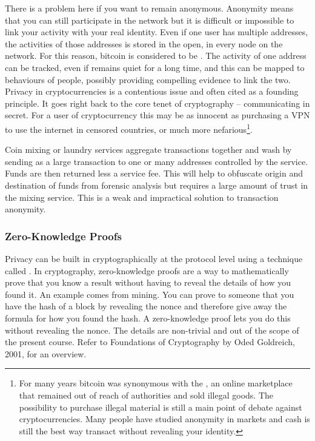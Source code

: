 There is a problem here if you want to remain anonymous. Anonymity means that you can still participate in the network but it is difficult or impossible to link your activity with your real identity. Even if one user has multiple addresses, the activities of those addresses is stored in the open, in every node on the network. For this reason, bitcoin is considered to be . The activity of one address can be tracked, even if remains quiet for a long time, and this can be mapped to behaviours of people, possibly providing compelling evidence to link the two. Privacy in cryptocurrencies is a contentious issue and often cited as a founding principle. It goes right back to the core tenet of cryptography -- communicating in secret. For a user of cryptocurrency this may be as innocent as purchasing a VPN to use the internet in censored countries, or much more nefarious\footnote{For many years bitcoin was synonymous with the , an online marketplace that remained out of reach of authorities and sold illegal goods. The possibility to purchase illegal material is still a main point of debate against cryptocurrencies. Many people have studied anonymity in markets and cash is still the best way transact without revealing your identity.}.

Coin mixing or laundry services aggregate transactions together and wash by sending as a large transaction to one or many addresses controlled by the service. Funds are then returned less a service fee. This will help to obfuscate origin and destination of funds from forensic analysis but requires a large amount of trust in the mixing service. This is a weak and impractical solution to transaction anonymity. 

\subsubsection*{Zero-Knowledge Proofs}
Privacy can be built in cryptographically at the protocol level using a technique called . In cryptography, zero-knowledge proofs are a way to mathematically prove that you know a result without having to reveal the details of how you found it. An example comes from mining. You can prove to someone that you have the hash of a block by revealing the nonce and therefore give away the formula for how you found the hash. A zero-knowledge proof lets you do this without revealing the nonce. The details are non-trivial and out of the scope of the present course. Refer to Foundations of Cryptography by Oded Goldreich, 2001, for an overview.


